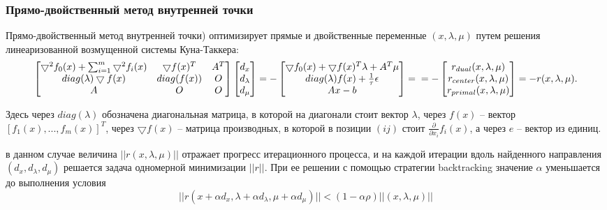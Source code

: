 \documentclass[12pt,a4paper]{article}
\begin{document}
	\subsubsection{Прямо-двойственный метод внутренней точки}
	Прямо-двойственный метод внутренней точки) оптимизирует прямые и двойственные переменные $(x, \lambda, \mu)$ путем
	решения линеаризованной возмущенной системы Куна-Таккера:
	\begin{equation}
		\left[
		\begin{matrix}
			\bigtriangledown^2f_0(x) + \sum_{i=1}^{m}	\bigtriangledown^2f_i(x)&  	\bigtriangledown f(x)^T & A^T\\ 
			diag(\lambda)\bigtriangledown f(x) & diag(f(x))  & O\\
			A & O & O
		\end{matrix}
		\right] 
		\left[
		\begin{matrix}
			d_x \\
			d_\lambda \\
			d_\mu \\
		\end{matrix}
		\right] = - 
		\left[
		\begin{matrix}
			\bigtriangledown f_0(x) + 	\bigtriangledown f(x)^T\lambda + A^T\mu \\  	
			diag(\lambda)f(x) + \frac{1}{\tau}\epsilon\\
			Ax - b
		\end{matrix}
		\right] =\\
		 = - \left[
		\begin{matrix}
			r_{dual}(x, \lambda, \mu) \\
			r_{center}(x, \lambda, \mu) \\
			r_{primal}(x, \lambda, \mu) \\
		\end{matrix}
		\right] = -r(x, \lambda, \mu).
	\end{equation}

	Здесь через $diag(\lambda)$ обозначена диагональная матрица, в которой на диагонали стоит вектор $\lambda$, через $f(x)$ – 
	вектор $[f_1(x), . . . , f_m(x)]^T$, через $\bigtriangledown f(x)$ – матрица производных, в которой в позиции $(ij)$ стоит $\frac{\partial}{\partial x_i}f_i(x)$, а через
	$e$ – вектор из единиц.
	
	в данном случае величина $||r(x, \lambda, \mu)||$ отражает прогресс итерационного процесса, и на каждой итерации вдоль найденного направления $(d_x, d_\lambda, d_\mu)$ решается задача
	одномерной минимизации $||r||$. При ее решении с помощью стратегии backtracking значение $\alpha$ уменьшается до
	выполнения условия
	\begin{equation}
		||r(x+\alpha d_{x}, \lambda+\alpha d_{\lambda}, \mu+\alpha d_{\mu})|| < (1-\alpha  \rho)||(x,\lambda,\mu)||
	\end{equation}
		
\end{document}
